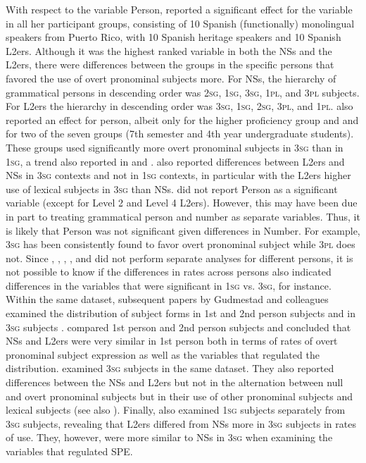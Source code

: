 \documentclass[output=paper,colorlinks,citecolor=brown,draftmode]{langscibook}
\begin{document}
With respect to the variable Person, \citet{Abreu2009} reported a significant effect for the variable in all her participant groups, consisting of 10 Spanish (functionally) monolingual speakers from Puerto Rico, with 10 Spanish heritage speakers and 10 Spanish L2ers. Although it was the highest ranked variable in both the NSs and the L2ers, there were differences between the groups in the specific persons that favored the use of overt pronominal subjects more. For NSs, the hierarchy of grammatical persons in descending order was 2\textsc{sg}, 1\textsc{sg}, 3\textsc{sg}, 1\textsc{pl}, and 3\textsc{pl} subjects. For L2ers the hierarchy in descending order was 3\textsc{sg}, 1\textsc{sg}, 2\textsc{sg}, 3\textsc{pl}, and 1\textsc{pl}. \citet{LinfordShin2013} also reported an effect for person, albeit only for the higher proficiency group and \citet{GeeslinDíaz-Campos2013} and \citet{GeeslinFafulas2015} for two of the seven groups (7th semester and 4th year undergraduate students). These groups used significantly more overt pronominal subjects in 3\textsc{sg} than in 1\textsc{sg}, a trend also reported in \citet{Linford2014} and \citet{PradaPérezFeroce2020}. \citet{GeeslinGudmestad2008} also reported differences between L2ers and NSs in 3\textsc{sg} contexts and not in 1\textsc{sg} contexts, in particular with the L2ers higher use of lexical subjects in 3\textsc{sg} than NSs. \citet{Long2016} did not report Person as a significant variable (except for Level 2 and Level 4 L2ers). However, this may have been due in part to treating grammatical person and number as separate variables. Thus, it is likely that Person was not significant given differences in Number. For example, 3\textsc{sg} has been consistently found to favor overt pronominal subject while 3\textsc{pl} does not. Since \citet{Abreu2009}, \citet{Linford2014}, \citet{LinfordShin2013}, \citet{Long2016}, and \citet{GeeslinGudmestad2008} did not perform separate analyses for different persons, it is not possible to know if the differences in rates across persons also indicated differences in the variables that were significant in 1\textsc{sg} vs. 3\textsc{sg}, for instance. Within the same dataset, subsequent papers by Gudmestad and colleagues examined the distribution of subject forms in 1st and 2nd person subjects \citep{GeeslinGudmestad2016} and in 3\textsc{sg} subjects \citep{GudmestadGeeslin2013}. \citet{GeeslinGudmestad2016} compared 1st person and 2nd person subjects and concluded that NSs and L2ers were very similar in 1st person both in terms of rates of overt pronominal subject expression as well as the variables that regulated the distribution. \citet{GudmestadGeeslin2013} examined 3\textsc{sg} subjects in the same dataset. They also reported differences between the NSs and L2ers but not in the alternation between null and overt pronominal subjects but in their use of other pronominal subjects and lexical subjects (see also \citealt{LinfordGeeslin2016}). Finally, \citet{PradaPérezFeroce2020} also examined 1\textsc{sg} subjects separately from 3\textsc{sg} subjects, revealing that L2ers differed from NSs more in 3\textsc{sg} subjects in rates of use. They, however, were more similar to NSs in 3\textsc{sg} when examining the variables that regulated SPE.
\end{document}
